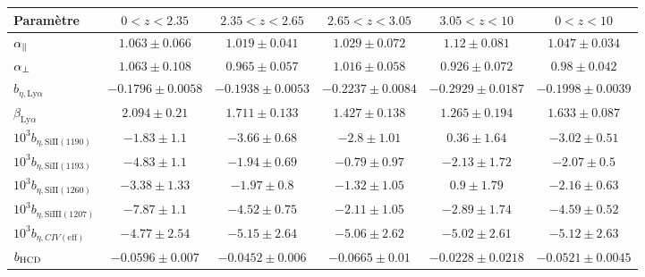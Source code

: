\documentclass[11pt, twoside, a4paper, openright]{report}
\begin{document}
\begin{table}[]
\begin{tabular}{lccccc}
\toprule
Param\`etre  & $\num{0} < z < \num{2.35}$ & $\num{2.35} < z < \num{2.65}$ & $\num{2.65} < z < \num{3.05}$ & $\num{3.05} < z < \num{10}$  & $\num{0} < z < \num{10}$ \\
\midrule
$\alpha_{\parallel}{} $ & $ 1.063 \pm 0.066$ & $ 1.019 \pm 0.041$ & $ 1.029 \pm 0.072$ & $ 1.12 \pm 0.081$ & $ 1.047 \pm 0.034$ \\
$\alpha_{\perp}{} $ & $ 1.063 \pm 0.108$ & $ 0.965 \pm 0.057$ & $ 1.016 \pm 0.058$ & $ 0.926 \pm 0.072$ & $ 0.98 \pm 0.042$ \\
$b_{\eta, \mathrm{Ly}\alpha} $ & $ -0.1796 \pm 0.0058$ & $ -0.1938 \pm 0.0053$ & $ -0.2237 \pm 0.0084$ & $ -0.2929 \pm 0.0187$ & $ -0.1998 \pm 0.0039$ \\
$\beta_{\mathrm{Ly}\alpha} $ & $ 2.094 \pm 0.21$ & $ 1.711 \pm 0.133$ & $ 1.427 \pm 0.138$ & $ 1.265 \pm 0.194$ & $ 1.633 \pm 0.087$ \\
$10^3 b_{\eta, \mathrm{SiII}(1190)} $ & $ -1.83 \pm 1.1$ & $ -3.66 \pm 0.68$ & $ -2.8 \pm 1.01$ & $ 0.36 \pm 1.64$ & $ -3.02 \pm 0.51$ \\
$10^3 b_{\eta, \mathrm{SiII}(1193)} $ & $ -4.83 \pm 1.1$ & $ -1.94 \pm 0.69$ & $ -0.79 \pm 0.97$ & $ -2.13 \pm 1.72$ & $ -2.07 \pm 0.5$ \\
$10^3 b_{\eta, \mathrm{SiII}(1260)} $ & $ -3.38 \pm 1.33$ & $ -1.97 \pm 0.8$ & $ -1.32 \pm 1.05$ & $ 0.9 \pm 1.79$ & $ -2.16 \pm 0.63$ \\
$10^3 b_{\eta, \mathrm{SiIII}(1207)} $ & $ -7.87 \pm 1.1$ & $ -4.52 \pm 0.75$ & $ -2.11 \pm 1.05$ & $ -2.89 \pm 1.74$ & $ -4.59 \pm 0.52$ \\
$10^3 b_{\eta, CIV(\mathrm{eff})} $ & $ -4.77 \pm 2.54$ & $ -5.15 \pm 2.64$ & $ -5.06 \pm 2.62$ & $ -5.02 \pm 2.61$ & $ -5.12 \pm 2.63$ \\
$b_{\textsc{HCD}} $ & $ -0.0596 \pm 0.007$ & $ -0.0452 \pm 0.006$ & $ -0.0665 \pm 0.01$ & $ -0.0228 \pm 0.0218$ & $ -0.0521 \pm 0.0045$ \\

\end{tabular}
\end{table}
\end{document}

